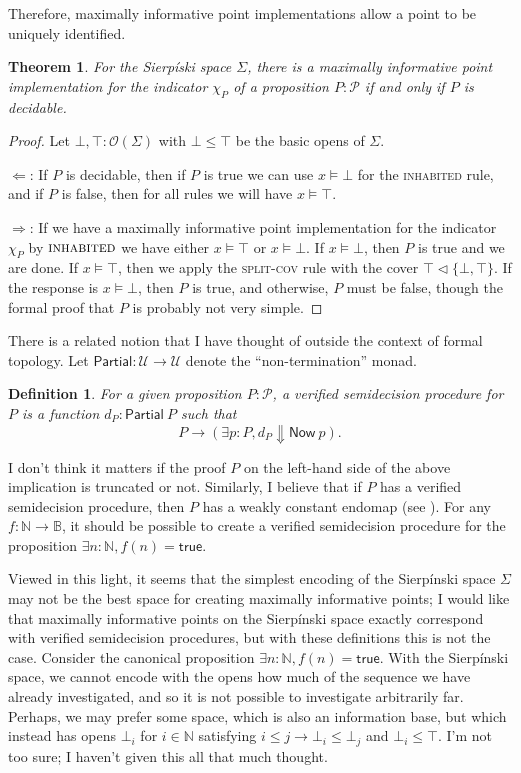 \documentclass{article}           %
\newtheorem{definition}{Definition}
\newtheorem{theorem}{Theorem}
\newcommand{\cov}{\vartriangleleft}
\newcommand{\Type}{\mathcal{U}}
\newcommand{\Prop}{\mathcal{P}}
\newcommand{\nat}{\mathbb{N}}
\newcommand{\Open}[1]{\mathcal{O}({#1})}
\newcommand{\bool}{\mathbb{B}}
\newcommand{\irule}[1]{\textsc{#1}}
\begin{document}
Therefore, maximally informative point implementations allow a point to be uniquely identified.
\begin{theorem}
For the Sierpíski space $\Sigma$, there is a maximally informative point implementation for the indicator $\chi_P$ of a proposition $P : \Prop$ if and only if $P$ is decidable.
\end{theorem}
\begin{proof}
Let $\bot, \top : \Open{\Sigma}$ with $\bot \le \top$ be the basic opens of $\Sigma$. 

$\Longleftarrow$: If $P$ is decidable, then if $P$ is true we can use $x \models \bot$ for the \irule{inhabited} rule, and if $P$ is false, then for all rules we will have $x \models \top$.

$\Longrightarrow$: If we have a maximally informative point implementation for the indicator $\chi_P$ by $\irule{inhabited}$ we have either $x \models \top$ or $x \models \bot$. If $x \models \bot$, then $P$ is true and we are done. If $x \models \top$, then we apply the \irule{split-cov} rule with the cover $\top \cov \{ \bot, \top \}$. If the response is $x \models \bot$, then $P$ is true, and otherwise, $P$ must be false, though the formal proof that $P$ is probably not very simple.
\end{proof}

There is a related notion that I have thought of outside the context of formal topology. Let $\mathsf{Partial} : \Type \to \Type$ denote the ``non-termination'' monad. 
\begin{definition}
For a given proposition $P : \Prop$, a \emph{verified semidecision procedure} for $P$ is a function $d_P : \mathsf{Partial}\ P$ such that
\[
P \to (\exists p : P, d_P \Downarrow \mathsf{Now}\ p).
\]
\end{definition}
I don't think it matters if the proof $P$ on the left-hand side of the above implication is truncated or not. Similarly, I believe that if $P$ has a verified semidecision procedure, then $P$ has a weakly constant endomap (see \cite{kraus2014}). For any $f : \nat \to \bool$, it should be possible to create a verified semidecision procedure for the proposition $\exists n : \nat, f(n) = \mathsf{true}$.

Viewed in this light, it seems that the simplest encoding of the Sierpínski space $\Sigma$ may not be the best space for creating maximally informative points; I would like that maximally informative points on the Sierpínski space exactly correspond with verified semidecision procedures, but with these definitions this is not the case. Consider the canonical proposition $\exists n : \nat, f(n) = \mathsf{true}$. With the Sierpínski space, we cannot encode with the opens how much of the sequence we have already investigated, and so it is not possible to investigate arbitrarily far. Perhaps, we may prefer some space, which is also an information base, but which instead has opens $\bot_i$ for $i \in \nat$ satisfying $i \le j \to \bot_i \le \bot_j$ and $\bot_i \le \top$. I'm not too sure; I haven't given this all that much thought.
\end{document}
